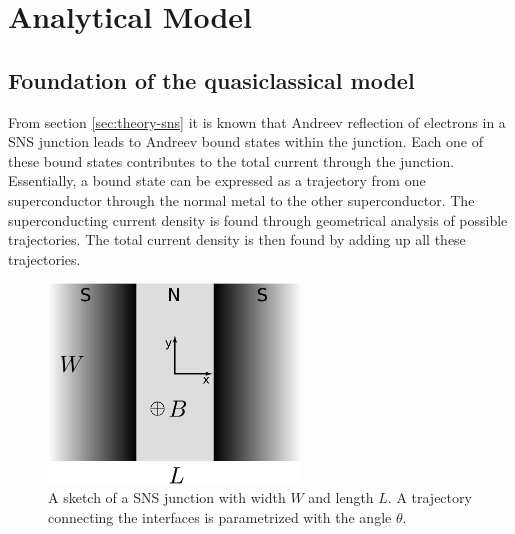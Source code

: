 \chapter{Analytical Model}
\label{ch:analyticalmodel}

\section{Foundation of the quasiclassical model}
From section \ref{sec:theory-sns} it is known that Andreev reflection of electrons in a SNS junction leads to Andreev bound states within the junction. Each one of these bound states contributes to the total current through the junction. Essentially, a bound state can be expressed as a trajectory from one superconductor through the normal metal to the other superconductor. The superconducting current density is found through geometrical analysis of possible trajectories. The total current density is then found by adding up all these trajectories.
\begin{figure}[h]
\centering	
\includegraphics[width=0.6\textwidth]{figure/analyticalmodel/sns_junction}
\caption{A sketch of a SNS junction with width $W$ and length $L$. A trajectory connecting the interfaces is parametrized with the angle $\theta$. }
\label{fig:sns_schematic}
\end{figure}
